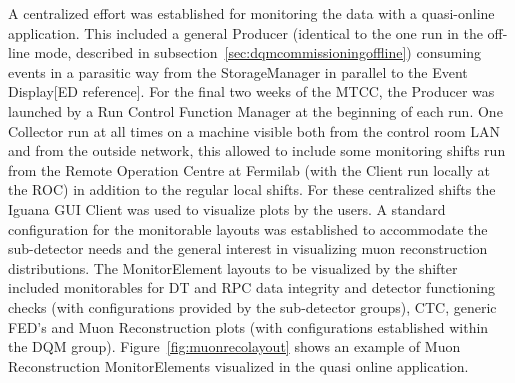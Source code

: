 \documentclass[a4paper]{cmspaper}
\begin{document}
A centralized effort was established for monitoring the data with a quasi-online application. This included a general Producer 
(identical to the one run in the off-line mode, described in subsection~\ref{sec:dqmcommissioningoffline}) consuming events in a 
parasitic way from the StorageManager in parallel to the Event Display[ED reference]. 
For the final two weeks of the MTCC, the Producer was launched by a Run Control Function Manager at the beginning of each run.
One Collector run at all times on a machine visible both
from the control room LAN and from the outside network, this allowed to include some monitoring shifts run from the Remote Operation Centre 
at Fermilab (with the Client run locally at the ROC) in addition to the regular local shifts. 
For these centralized shifts the Iguana GUI Client was used to visualize plots by the users. 
A standard configuration for the monitorable layouts 
was established to accommodate the sub-detector needs and the general interest in visualizing muon reconstruction distributions.
The MonitorElement layouts to be visualized by the shifter included monitorables for DT and RPC data integrity and detector 
functioning checks (with configurations provided by the sub-detector groups), CTC, generic FED's and Muon Reconstruction plots 
(with configurations established within the DQM group). Figure~\ref{fig:muonrecolayout} shows an example of Muon Reconstruction MonitorElements
visualized in the quasi online application.
\end{document}
